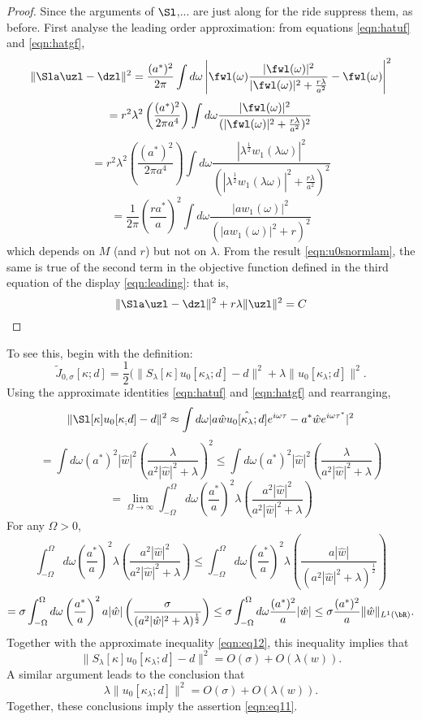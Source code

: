 \begin{proof}
  Since the arguments of $\Sl$,... are just along for the ride
  suppress them, as before.
  First analyse the leading order approximation: from equations
  \ref{eqn:hatuf} and \ref{eqn:hatgf},
  \[
  \|\Sla \uzl -\dzl\|^2 = \frac{(a^*)^2}{2\pi} \int d\omega \left| \fwl(\omega) \frac{|\fwl(\omega)|^2}{|\fwl(\omega)|^2 + \frac{r\lambda}{a^2}}
    - \fwl(\omega)\right|^2
\]
\[
  =r^2\lambda^2\left(\frac{(a^*)^2}{2\pi a^4}\right) \int d\omega \frac{| \fwl(\omega)|^2}
  {(|\fwl(\omega)|^2 + \frac{r\lambda}{a^2})^2}
\]
\[
  =r^2\lambda^2\left(\frac{(a^*)^2}{2\pi a^4}\right) \int d\omega
  \frac{| \lambda^{\frac{1}{2}}w_1(\lambda \omega)|^2}
  {(|\lambda^{\frac{1}{2}}w_1(\lambda \omega)|^2 + \frac{r\lambda}{a^2})^2}
\]
\[
  = \frac{1}{2\pi}\left(\frac{ra^*}{a}\right)^2 \int d\omega
  \frac{|aw_1(\omega)|^2}
  {(|aw_1(\omega)|^2 + r)^2}
\]
which depends on $M$ (and $r$) but not on $\lambda$. From the result
\ref{eqn:u0snormlam}, the same is true of the second term in the
objective function defined in the third equation  of the display
\ref{eqn:leading}: that is,
\begin{equation}
  \label{eqn:leadingconst}
  \|\Sla \uzl -\dzl\|^2 + r\lambda \|\uzl\|^2 = C
\end{equation}

\end{proof}
To see this, begin with the definition:
\[
  \tilde{J}_{0,\sigma}[\kappa;d] = \frac{1}{2}
  (\|S_{\lambda}[\kappa]u_0[\kappa_{\lambda};d]-d\|^2 + \lambda \|u_0[\kappa_{\lambda};d]\|^2.
\]
Using the approximate identities \ref{eqn:hatuf} and \ref{eqn:hatgf} and
rearranging,
\[
\|\Sl[\kappa]u_0[\kappa_;d]-d\|^2 
  \approx \int d\omega
  |a\hat{w}\hat{u_0[\kappa_{\lambda};d]}e^{i\omega\tau}-a^*\hat{w}e^{i\omega\tau^*}|^2
\]
\[
  = \int d\omega
  (a^*)^2|\hat{w}|^2\left(\frac{\lambda}{a^2|\hat{w}|^2 +
      \lambda}\right)^2   
\le \int d\omega (a^*)^2|\hat{w}|^2
  \left(\frac{\lambda}{a^2|\hat{w}|^2 + \lambda}\right)
\]
\begin{equation}
  \label{eqn:eq12}
  = \lim_{\Omega \rightarrow \infty} \int_{-\Omega}^{\Omega} d\omega \left(\frac{a^*}{a}\right)^2\lambda
  \left(\frac{a^2|\hat{w}|^2}{a^2|\hat{w}|^2 + \lambda}\right)
\end{equation}
For any $\Omega > 0$,
\[
\int_{-\Omega}^{\Omega} d\omega \left(\frac{a^*}{a}\right)^2\lambda\left(\frac{a^2|\hat{w}|^2}{a^2|\hat{w}|^2 + \lambda}\right)
\le \int_{-\Omega}^{\Omega} d\omega \left(\frac{a^*}{a}\right)^2 \lambda
  \left(\frac{ a|\hat{w}|}{(a^2|\hat{w}|^2 +
      \lambda)^{\frac{1}{2}}}\right)
\]
\[
  = \sigma \int_{-\Omega}^{\Omega} d\omega \left(\frac{a^*}{a}\right)^2 a|\hat{w}|
  \left(\frac{\sigma }{(a^2|\hat{w}|^2 +\lambda)^{\frac{1}{2}}}\right)
  \le \sigma \int_{-\Omega}^{\Omega} d\omega \frac{(a^*)^2}{a}
  |\hat{w}|
  \le \sigma \frac{(a^*)^2}{a} \|\hat{w}\|_{L^1(\bR)}.
\]
Together with the approximate inequality \ref{eqn:eq12}, this
inequality implies
that
\[
  \|S_{\lambda}[\kappa]u_0[\kappa_{\lambda};d] - d\|^2 = O(\sigma) + O(\lambda(w)).
\]
A similar argument leads to the conclusion that
\[
  \lambda\|u_0[\kappa_{\lambda};d]\|^2 = O(\sigma) + O(\lambda(w)).
\]
Together, these conclusions imply the assertion \ref{eqn:eq11}.







